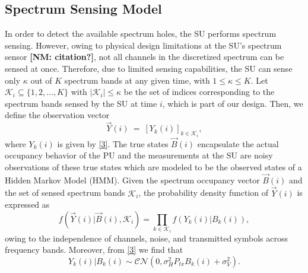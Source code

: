 \documentclass[10pt,twocolumn]{IEEEtran}
\newcommand{\nm}[1]{{\color{blue}\bf{[NM: #1]}}}
\begin{document}
\subsection{Spectrum Sensing Model}
In order to detect the available spectrum holes, the SU performs spectrum sensing. However, owing to physical design limitations at the SU's spectrum sensor \nm{citation?}, not all channels in the discretized spectrum can be sensed at once. Therefore, due to limited sensing capabilities, the SU can sense only $\kappa$ out of $K$ spectrum bands at any given time, with $1\leq \kappa\leq K$. Let $\mathcal K_{i}\subseteq\{1,2,\dots,K\}$ with $|\mathcal K_i|\leq \kappa$ be the set of indices corresponding to the spectrum bands sensed by the SU at time $i$, which is part of our design.
Then, we define the observation vector
\begin{equation}\label{8}
    \vec{Y}(i)\ =\ [Y_k(i)]_{k\in\mathcal K_i},
\end{equation}
where $Y_k(i)$ is given by \eqref{3}.
The true states $\vec{B}(i)$ encapsulate the actual occupancy behavior of the PU and the measurements at the SU are noisy observations of these true states which are modeled to be the observed states of a Hidden Markov Model (HMM). Given the spectrum occupancy vector $\vec{B}(i)$ and the set of sensed spectrum bands $\mathcal K_i$, the probability density function of $\vec{Y}(i)$ is expressed as
\begin{equation}\label{9}
    f(\vec{Y}(i)|\vec{B}(i),\mathcal K_i)=\prod_{k\in\mathcal K_i}f(Y_k(i)|B_k(i)),
\end{equation}
owing to the independence of channels, noise, and transmitted symbols across frequency bands. Moreover, from \eqref{3} we find that
\begin{equation}\label{10}
 Y_k(i)|B_k(i)\sim \mathcal{CN}(0,\sigma_H^2P_{tx}B_k(i)+\sigma_V^2).
\end{equation}
\end{document}
